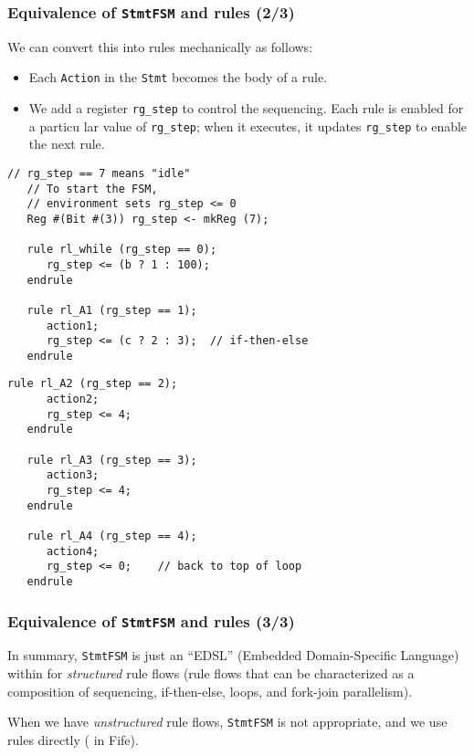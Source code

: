 \begin{frame}[fragile]
\frametitle{Equivalence of {\tt StmtFSM} and rules (2/3)}

\footnotesize

We can convert this into rules mechanically as follows:
\begin{itemize}
\item Each {\tt Action} in the {\tt Stmt} becomes the body of a rule.

\item We add a register {\tt rg\_step} to control the sequencing.  Each rule
      is enabled for a particu lar value of {\tt rg\_step}; when it
      executes, it updates {\tt rg\_step} to enable the next rule.

\end{itemize}

\begin{minipage}[t]{0.47\textwidth}
\begin{Verbatim}[frame=single]
   // rg_step == 7 means "idle"
   // To start the FSM,
   // environment sets rg_step <= 0
   Reg #(Bit #(3)) rg_step <- mkReg (7);

   rule rl_while (rg_step == 0);
      rg_step <= (b ? 1 : 100);
   endrule

   rule rl_A1 (rg_step == 1);
      action1;
      rg_step <= (c ? 2 : 3);  // if-then-else
   endrule
\end{Verbatim}
\end{minipage}
\begin{minipage}[t]{0.47\textwidth}
\begin{Verbatim}[frame=single]
   rule rl_A2 (rg_step == 2);
      action2;
      rg_step <= 4;
   endrule

   rule rl_A3 (rg_step == 3);
      action3;
      rg_step <= 4;
   endrule

   rule rl_A4 (rg_step == 4);
      action4;
      rg_step <= 0;    // back to top of loop
   endrule
\end{Verbatim}
\end{minipage}

\end{frame}


\begin{frame}[fragile]
\frametitle{Equivalence of {\tt StmtFSM} and rules (3/3)}

\footnotesize

In summary, {\tt StmtFSM} is just an ``EDSL'' (Embedded
Domain-Specific Language) within {\BSV} for \emph{structured} rule
flows (rule flows that can be characterized as a composition of
sequencing, if-then-else, loops, and fork-join parallelism).

\vspace{5ex}

When we have \emph{unstructured} rule flows, {\tt StmtFSM} is not
appropriate, and we use rules directly ({\eg} in Fife).

\end{frame}


